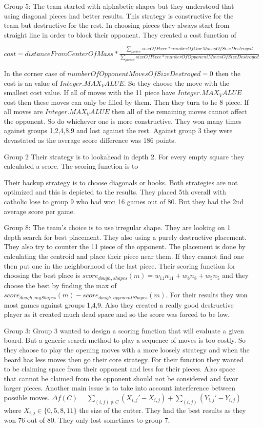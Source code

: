 Group 5:
The team started with alphabetic shapes but they understood that using diagonal
pieces had better results. This strategy is constructive for the team but destructive
for the rest. In choosing pieces they always start from straight line in order to
block their opponent. They created a cost function of 

$cost = distanceFromCenterOfMass * 
\frac{\sum_{pieces}{sizeOfPiece*numberOfOurMovesOfSizeDestroyed}}{\sum_{pieces}{sizeOfPiece*numberOfOpponentMovesOfSizeDestroyed}}$

In the corner case of $numberOfOpponentMovesOfSizeDestroyed = 0$ then the cost 
is an value of $Integer.MAX_VALUE$. So they choose the move with the smallest cost
value. If all of moves with the 11 piece have $Integer.MAX_VALUE$ cost then these
moves can only be filled by them. Then they turn to he 8 piece. If all moves are
$Integer.MAX_VALUE$ then all of the remaining moves cannot affect the opponent.
So do whichever one is more constructive. They won many times against groups 
1,2,4,8,9 and lost against the rest. Against group 3 they were devastated as the
average score difference was 186 points. 

Group 2
Their strategy is to lookahead in depth 2. For every empty square they calculated
a score. The scoring function is to  

Their backup strategy is to choose diagonals or hooks. Both strategies are not 
optimized and this is depicted to the results. They placed 5th overall with
catholic lose to group 9 who had won 16 games out of 80. But they had the 2nd
average score per game.

Group 8:
The team's choice is to use irregular shape. They are looking on 1 depth search
for best placement. They also using a purely destructive placement. They also 
try to counter the 11 piece of the opponent. The placement is done by calculating
the centroid and place their piece near them. If they cannot find one then put 
one in the neighborhood of the last piece. Their scoring function for choosing 
the best place is $score_{dough,shapes}(m) = w_{11}n_{11} + w_8n_8 + w_5n_5$ and
they choose the best by finding the max of $score_{dough,myShapes}(m) - 
score_{dough,opponentShapes}(m)$. For their results they won most games against
groups 1,4,9. Also they created a really good destructive player as it created
much dead space and so the score was forced to be low.

Group 3:
Group 3 wanted to design a scoring function that will evaluate a given board.
But a generic search method to play a sequence of moves is too costly. So they 
choose to play the opening moves with a more loosely strategy and when the beard
has less moves then go their core strategy. For their function they wanted to be 
claiming space from their opponent and less for their pieces. Also space that 
cannot be claimed from the opponent should not be considered and favor larger 
pieces. Another main issue is to take into account interference between possible
moves. 
$\Delta f(C) = \sum\limits_{(i,j)\notin C} (X_{i,j}' - X_{i,j}) + \sum\limits_{(i,j)} (Y_{i,j}' - Y_{i,j})$ 
where $X_{i,j} \in \{0,5,8,11\}$ the size of the cutter. They had the best results
as they won 76 out of 80. They only lost sometimes to group 7.

